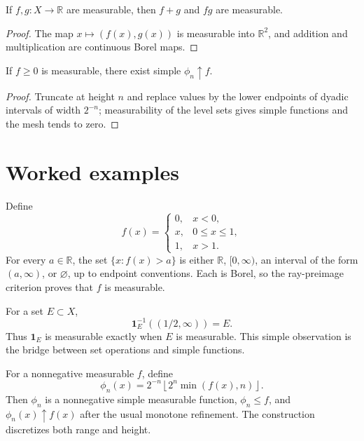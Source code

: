\begin{theorem}\label{thm:iii02-02}
If $f,g:X\to\mathbb R$ are measurable, then $f+g$ and $fg$ are measurable.
\begin{proof}
The map $x\mapsto(f(x),g(x))$ is measurable into $\mathbb R^2$, and addition and multiplication are continuous Borel maps.
\end{proof}
\end{theorem}

\begin{theorem}\label{thm:iii02-03}
If $f\ge0$ is measurable, there exist simple $\phi_n\uparrow f$.
\begin{proof}
Truncate at height $n$ and replace values by the lower endpoints of dyadic intervals of width $2^{-n}$; measurability of the level sets gives simple functions and the mesh tends to zero.
\end{proof}
\end{theorem}

\section{Worked examples}

\begin{example}\label{ex:iii02-worked-01}
Define
\[
f(x)=\begin{cases}0,&x<0,\\ x,&0\le x\le1,\\1,&x>1.\end{cases}
\]
For every \(a\in\mathbb R\), the set \(\{x:f(x)>a\}\) is either
\(\mathbb R\), \([0,\infty)\), an interval of the form \((a,\infty)\), or
\(\varnothing\), up to endpoint conventions. Each is Borel, so the ray-preimage
criterion proves that \(f\) is measurable.
\end{example}

\begin{example}\label{ex:iii02-worked-02}
For a set \(E\subset X\),
\[
\mathbf 1_E^{-1}((1/2,\infty))=E.
\]
Thus \(\mathbf1_E\) is measurable exactly when \(E\) is measurable. This simple
observation is the bridge between set operations and simple functions.
\end{example}

\begin{example}\label{ex:iii02-worked-03}
For a nonnegative measurable \(f\), define
\[
\phi_n(x)=2^{-n}\left\lfloor 2^n\min(f(x),n)\right\rfloor.
\]
Then \(\phi_n\) is a nonnegative simple measurable function,
\(\phi_n\le f\), and \(\phi_n(x)\uparrow f(x)\) after the usual monotone
refinement. The construction discretizes both range and height.
\end{example}

